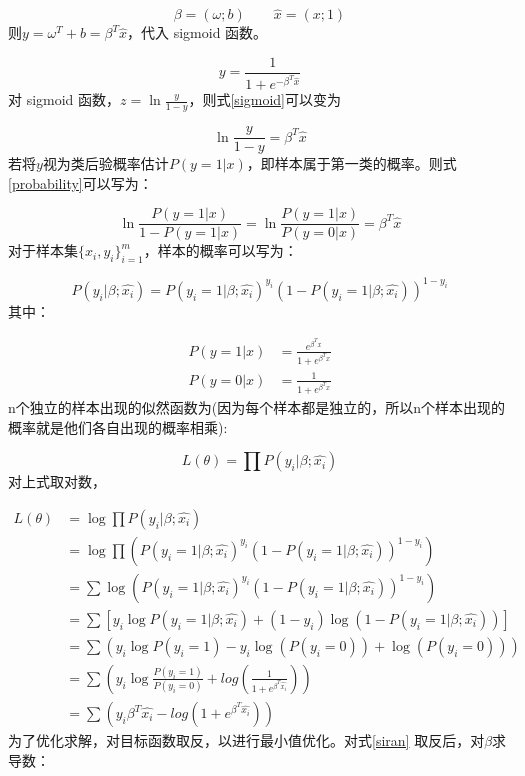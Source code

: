 \[
\beta=(\omega;b) \qquad \hat{x}=(x;1)
\]
则$y=\omega^T+b=\beta^T\hat{x}$，代入 sigmoid 函数。

\begin{equation}\label{sigmoid}
y=\frac{1}{1+e^{-\beta^T\hat{x}}}
\end{equation}
对 sigmoid 函数，$z=\ln\frac{y}{1-y}$，则式\eqref{sigmoid}可以变为

\begin{equation}\label{probability}
\ln\frac{y}{1-y}=\beta^T\hat{x}
\end{equation}
若将$y$视为类后验概率估计$P(y=1|x)$，即样本属于第一类的概率。则式\eqref{probability}可以写为：

\[
\ln\frac{P(y=1|x)}{1-P(y=1|x)}=\ln\frac{P(y=1|x)}{P(y=0|x)}=\beta^T\hat{x}
\]
对于样本集$\{x_i,y_i\}^{m}_{i=1}$，样本的概率可以写为：

\begin{equation*}
P(y_i|\beta;\hat{x_i})=P(y_i=1|\beta;\hat{x_i})^{y_i}\left(1-P(y_i=1|\beta;\hat{x_i})\right)^{1-y_i}
\end{equation*}
其中：

\begin{align}
P(y=1|x)&=\frac{e^{\beta^Tx}}{1+e^{\beta^Tx}}\\
P(y=0|x)&=\frac{1}{1+e^{\beta^Tx}}
\end{align}
n个独立的样本出现的似然函数为(因为每个样本都是独立的，所以n个样本出现的概率就是他们各自出现的概率相乘):

\begin{equation}
L(\theta)=\prod	P(y_i|\beta;\hat{x_i})
\end{equation}
对上式取对数，

\begin{equation}\label{siran}
\begin{split}
L(\theta)&=\log\prod	P(y_i|\beta;\hat{x_i})\\
&=\log \prod \left(P(y_i=1|\beta;\hat{x_i})^{y_i}\left(1-P(y_i=1|\beta;\hat{x_i})\right)^{1-y_i} \right)\\
&=\sum\log \left(P(y_i=1|\beta;\hat{x_i})^{y_i}\left(1-P(y_i=1|\beta;\hat{x_i})\right)^{1-y_i} \right)\\
&=\sum \left[ y_i\log P(y_i=1|\beta;\hat{x_i}) + (1-y_i)\log(1-P(y_i=1|\beta;\hat{x_i}))\right]\\
&=\sum \left( y_i \log P(y_i=1) - y_i \log(P(y_i=0))+\log(P(y_i=0))\right)\\
&=\sum \left( y_i \log \frac{P(y_i=1)}{P(y_i=0)} + log(\frac{1}{1+e^{\beta^T\hat{x_i}}})\right)\\
&=\sum \left(
y_i\beta^T\hat{x_i}-log(1+e^{\beta^T\hat{x_i}})
\right)
\end{split}
\end{equation}
为了优化求解，对目标函数取反，以进行最小值优化。对式\eqref{siran}	取反后，对$\beta$求导数：

